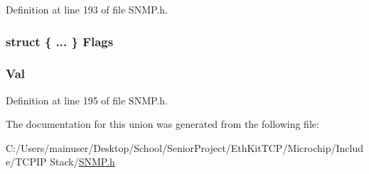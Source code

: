 Definition at line 193 of file S\+N\+M\+P.\+h.

\hypertarget{union_s_n_m_p___s_t_a_t_u_s_a3b55867bf6f020d45aa147b899f1f3a1}{}
\subsubsection[{Flags}]{\setlength{\rightskip}{0pt plus 5cm}struct \{ ... \}   Flags}\label{union_s_n_m_p___s_t_a_t_u_s_a3b55867bf6f020d45aa147b899f1f3a1}
\hypertarget{union_s_n_m_p___s_t_a_t_u_s_a5ab8c2bf45b20b5f7aa3a4f083896cec}{}
\subsubsection[{Val}]{ Val}\label{union_s_n_m_p___s_t_a_t_u_s_a5ab8c2bf45b20b5f7aa3a4f083896cec}


Definition at line 195 of file S\+N\+M\+P.\+h.



The documentation for this union was generated from the following file\+:\begin{DoxyCompactItemize}
\item 
C\+:/\+Users/mainuser/\+Desktop/\+School/\+Senior\+Project/\+Eth\+Kit\+T\+C\+P/\+Microchip/\+Include/\+T\+C\+P\+I\+P Stack/\hyperlink{_s_n_m_p_8h}{S\+N\+M\+P.\+h}\end{DoxyCompactItemize}
